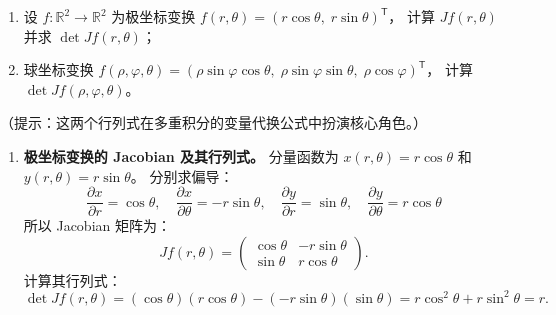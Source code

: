 \documentclass[lang=cn,11pt]{elegantbook}
\begin{document}
\begin{exercise}
\begin{enumerate}
  \item[(1)] 设 $f:\mathbb R^2\to\mathbb R^2$ 为极坐标变换
        $f(r,\theta)=(r\cos\theta,\;r\sin\theta)^{\mathsf T}$，
        计算 $Jf(r,\theta)$ 并求 $\det Jf(r,\theta)$；
  \item[(2)] 球坐标变换
        $f(\rho,\varphi,\theta)=(\rho\sin\varphi\cos\theta,\;\rho\sin\varphi\sin\theta,\;\rho\cos\varphi)^{\mathsf T}$，
        计算 $\det Jf(\rho,\varphi,\theta)$。
\end{enumerate}
（提示：这两个行列式在多重积分的变量代换公式中扮演核心角色。）
\end{exercise}
\begin{solution}
\begin{enumerate}
  \item[(1)] \textbf{极坐标变换的 Jacobian 及其行列式。}
  分量函数为 $x(r,\theta) = r\cos\theta$ 和 $y(r,\theta) = r\sin\theta$。
  分别求偏导：
  \[
  \frac{\partial x}{\partial r} = \cos\theta, \quad \frac{\partial x}{\partial \theta} = -r\sin\theta,\quad
  \frac{\partial y}{\partial r} = \sin\theta, \quad \frac{\partial y}{\partial \theta} = r\cos\theta
  \]
  所以 Jacobian 矩阵为：
  \[
  Jf(r,\theta) = \begin{pmatrix} \cos\theta & -r\sin\theta \\ \sin\theta & r\cos\theta \end{pmatrix}.
  \]
  计算其行列式：
  \[
  \det Jf(r,\theta) = (\cos\theta)(r\cos\theta) - (-r\sin\theta)(\sin\theta) = r\cos^2\theta + r\sin^2\theta = r.
  \]


\end{enumerate}
\end{solution}
\end{document}
